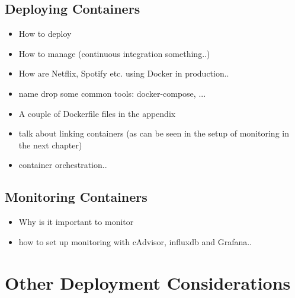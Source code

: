 \subsection{Deploying Containers}

\begin{itemize}
\item How to deploy
\item How to manage (continuous integration something..)
\item How are Netflix, Spotify etc. using Docker in production..
\item name drop some common tools: docker-compose, ...
\item A couple of Dockerfile files in the appendix
\item talk about linking containers (as can be seen in the setup of monitoring in the next chapter)
\item container orchestration..
\end{itemize}

\subsection{Monitoring Containers}

\begin{itemize}
\item Why is it important to monitor
\item how to set up monitoring with cAdvisor, influxdb and Grafana..
\end{itemize}

\section{Other Deployment Considerations}

